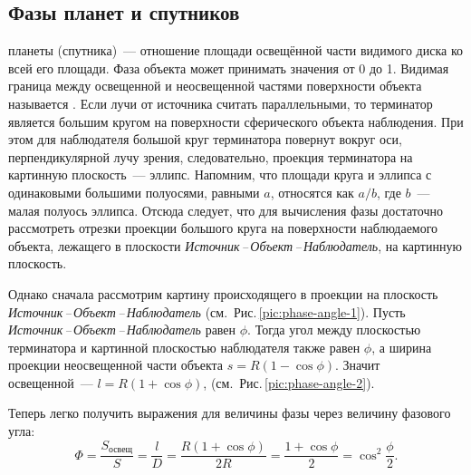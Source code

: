 \subsection{Фазы планет и спутников}

 планеты (спутника)~--- отношение площади освещённой  части видимого диска ко всей его площади. Фаза объекта может принимать значения от 0 до 1. Видимая граница между освещенной и неосвещенной частями поверхности объекта называется . Если лучи от источника считать параллельными, то терминатор является большим кругом на поверхности сферического объекта наблюдения. При этом для наблюдателя большой круг терминатора повернут вокруг оси, перпендикулярной лучу зрения, следовательно, проекция терминатора на картинную плоскость~--- эллипс. Напомним, что площади круга и эллипса с одинаковыми большими полуосями, равными $a$, относятся как $a/b$, где $b$~--- малая полуось эллипса. Отсюда следует, что для вычисления фазы достаточно рассмотреть отрезки проекции большого круга на поверхности наблюдаемого объекта, лежащего в плоскости {\slshape Источник\,--\,Объект\,--\,Наблюдатель}, на картинную плоскость.


Однако сначала рассмотрим картину происходящего в проекции на плоскость {\slshape Источник\,--\,Объект\,--\,Наблюдатель} (см.~Рис.\,\ref{pic:phase-angle-1}). Пусть  {\slshape Источник\,--\,Объект\,--\,Наблюдатель} равен $\phi$. Тогда угол между плоскостью терминатора и картинной плоскостью наблюдателя также равен $\phi$, а ширина проекции неосвещенной части объекта $s = R(1 - \cos \phi)$. Значит освещенной~--- $l = R( 1+ \cos \phi)$, (см.~Рис.\,\ref{pic:phase-angle-2}).

Теперь легко получить выражения для величины фазы через величину фазового угла:
\begin{equation}
	\Phi = \frac{S_\text{освещ}}{S} = \frac{l}{D} = \frac{R ( 1 + \cos \phi )}{2R} = \frac{1 + \cos \phi}{2} =  \cos^2 \frac{\phi}{2}.
\end{equation}

